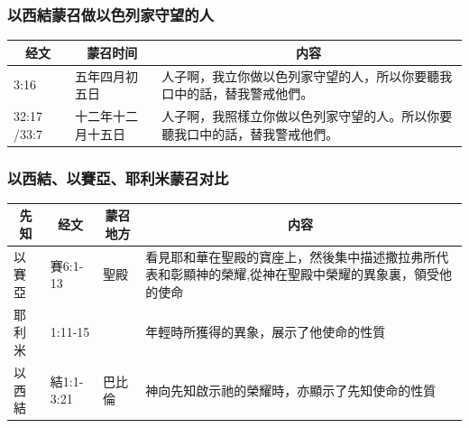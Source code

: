 \subsubsection{以西結蒙召做以色列家守望的人}
\begin{table}[H]
\centering
\begin{tabular}{p{1.2cm}|p{}|p{}}\hline\hline
\multicolumn{1}{c|}{经文}&\multicolumn{1}{c|}{蒙召时间}&\multicolumn{1}{c}{内容}\\\hline
3:16&五年四月初五日&人子啊，我立你做以色列家守望的人，所以你要聽我口中的話，替我警戒他們。\\\hline

32:17 /33:7&十二年十二月十五日&人子啊，我照樣立你做以色列家守望的人。所以你要聽我口中的話，替我警戒他們。 \\\hline
\end{tabular}
\end{table}

\subsubsection{以西結、以賽亞、耶利米蒙召对比}
\begin{table}[H]
\centering
\begin{tabular}{p{1.2cm}|p{}|p{}|p{}}\hline\hline
\multicolumn{1}{c|}{先知}&\multicolumn{1}{c|}{经文}&\multicolumn{1}{c|}{蒙召地方}&\multicolumn{1}{c}{内容}\\\hline
以賽亞&賽6:1-13&聖殿&看見耶和華在聖殿的寶座上，然後集中描述撒拉弗所代表和彰顯神的榮耀,從神在聖殿中榮耀的異象裏，領受他的使命\\\hline
耶利米&1:11-15&&年輕時所獲得的異象，展示了他使命的性質\\\hline 
以西結&結1:1-3:21&巴比倫&神向先知啟示祂的榮耀時，亦顯示了先知使命的性質\\\hline
\end{tabular}
\end{table}


